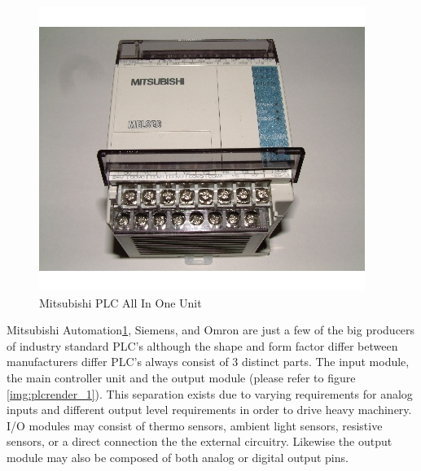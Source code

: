 \begin{figure}[htp]
    \centering
    \includegraphics[width=\imgsmlphoto]{./images/c01_mitsubishiplc.jpg}
    \caption{Mitsubishi PLC All In One Unit \cite{img_c01_MitsubishiPlc}}
    \label{img:mitsubishiplc}
\end{figure}
Mitsubishi Automation\ref{img:mitsubishiplc}, Siemens, and Omron are just a few of the big producers of industry standard PLC's although the shape and form factor differ between manufacturers differ PLC's always consist of 3 distinct parts.  The input module, the main controller unit and the output module (please refer to figure \ref{img:plcrender_1}). This separation exists due to varying requirements for analog inputs and different output level requirements in order to drive heavy machinery. I/O modules may consist of thermo sensors, ambient light sensors, resistive sensors, or a direct connection the the external circuitry. Likewise the output module may also be composed of both analog or digital output pins.
